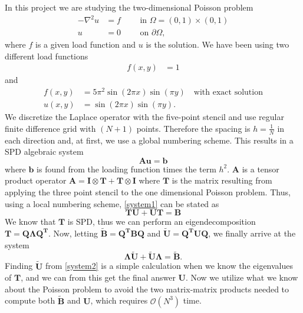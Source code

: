 In this project we are studying the two-dimensional Poisson problem
\begin{align*}
-\nabla^2u&=f \quad\quad\text{ in } \Omega=(0,1)\times(0,1)\\
u&=0 \quad\quad\text{ on } \partial \Omega, \nonumber
\end{align*}
where $f$ is a given load function and $u$ is the solution. We have been using two different load functions
\begin{align*}
f(x,y)&=1
\end{align*}
and
\begin{align}
\label{loadfunc2}
f(x,y)&=5\pi^2\sin(2\pi x)\sin(\pi y) \quad\text{with exact solution} \\
u(x,y)&=\sin(2\pi x)\sin(\pi y).\nonumber
\end{align}
We discretize the Laplace operator with the five-point stencil and use regular finite difference grid with $(N+1)$ points. Therefore the spacing is $h = \frac{1}{N}$ in each direction and, at first, we use a global numbering scheme. This results in a SPD algebraic system
\begin{equation}
	\mathbf{Au} = \mathbf{b}
	\label{system1}
\end{equation}
where $\mathbf{b}$ is found from the loading function times the term $h^2$. $\mathbf{A}$ is a tensor product operator $\mathbf{A} = \mathbf{I}\otimes\mathbf{T} + \mathbf{T}\otimes\mathbf{I}$ where $\mathbf{T}$ is the matrix resulting from applying the three point stencil to the one dimensional Poisson problem. Thus, using a local numbering scheme, \eqref{system1} can be stated as 
\begin{equation*}
	\mathbf{TU} + \mathbf{UT} = \mathbf{B}
\end{equation*}
We know that $\mathbf{T}$ is SPD, thus we can perform an eigendecomposition $\mathbf{T} = \mathbf{Q\Lambda Q^T}$. Now, letting $\mathbf{\widetilde{B}} = \mathbf{Q^TBQ}$ and $\mathbf{\widetilde{U}} = \mathbf{Q^TUQ}$, we finally arrive at the system 
\begin{equation}
	\mathbf{\Lambda\widetilde{U}} + \mathbf{\widetilde{U}\Lambda} = \mathbf{\widetilde{B}}.
	\label{system2}
\end{equation}
Finding $\mathbf{\widetilde{U}}$ from \eqref{system2} is a simple calculation when we know the eigenvalues of $\mathbf{T}$, and we can from this get the final answer $\mathbf{U}$. Now we utilize what we know about the Poisson problem to avoid the two matrix-matrix products needed to compute both $\mathbf{\widetilde{B}}$ and $\mathbf{U}$, which requires $\mathcal{O}(N^3)$ time. \\
